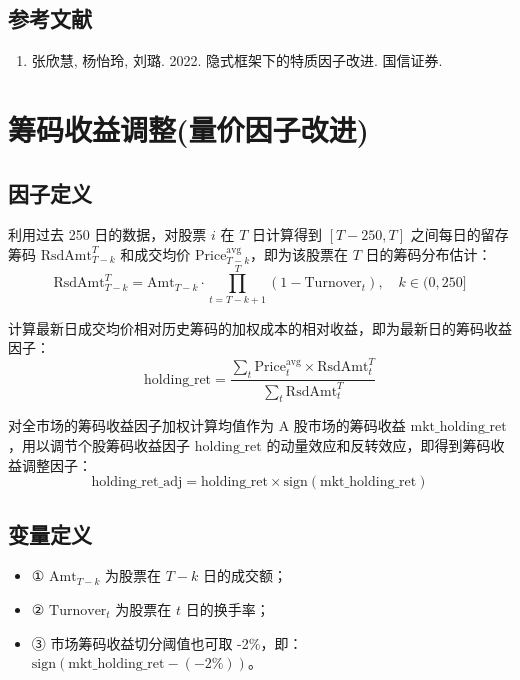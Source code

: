 \documentclass{article}
\begin{document}
\subsection{参考文献}
\begin{enumerate}
    \item 张欣慧, 杨怡玲, 刘璐. 2022. 隐式框架下的特质因子改进. 国信证券.
\end{enumerate}

\section{筹码收益调整(量价因子改进)}

\subsection{因子定义}

利用过去 250 日的数据，对股票 \( i \) 在 \( T \) 日计算得到 \([T-250, T]\) 之间每日的留存筹码 \( \mathrm{RsdAmt}_{T-k}^T \) 和成交均价 \( \mathrm{Price}_{T-k}^{\mathrm{avg}} \)，即为该股票在 \( T \) 日的筹码分布估计：
\begin{equation}
    \mathrm{RsdAmt}_{T-k}^T = \mathrm{Amt}_{T-k} \cdot \prod_{t=T-k+1}^{T} (1 - \mathrm{Turnover}_t), \quad k \in (0, 250]
\end{equation}

计算最新日成交均价相对历史筹码的加权成本的相对收益，即为最新日的筹码收益因子：
\begin{equation}
    \mathrm{holding\_ret} = \frac{\sum_t \mathrm{Price}_t^{\mathrm{avg}} \times \mathrm{RsdAmt}_t^T}{\sum_t \mathrm{RsdAmt}_t^T} 
\end{equation}

对全市场的筹码收益因子加权计算均值作为 A 股市场的筹码收益 \( \mathrm{mkt\_holding\_ret} \)，用以调节个股筹码收益因子 \( \mathrm{holding\_ret} \) 的动量效应和反转效应，即得到筹码收益调整因子：
\begin{equation}
    \mathrm{holding\_ret\_adj} = \mathrm{holding\_ret} \times \mathrm{sign}(\mathrm{mkt\_holding\_ret})
\end{equation}

\subsection{变量定义}
\begin{itemize}
    \item ① \( \mathrm{Amt}_{T-k} \) 为股票在 \( T-k \) 日的成交额；
    \item ② \( \mathrm{Turnover}_t \) 为股票在 \( t \) 日的换手率；
    \item ③ 市场筹码收益切分阈值也可取 -2\%，即：\( \mathrm{sign}(\mathrm{mkt\_holding\_ret} - (-2\%)) \)。
\end{itemize}
\end{document}
